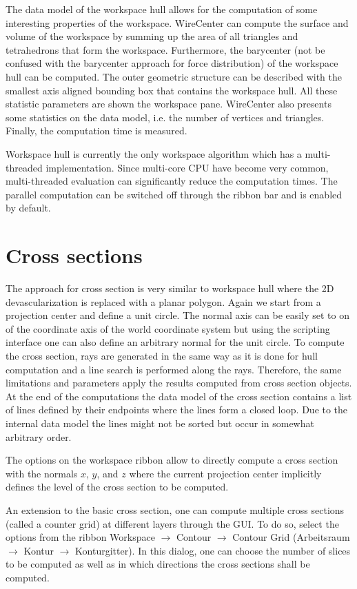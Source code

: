 \documentclass[11pt,a4paper,onepage,openany]{book}
\begin{document}
The data model of the workspace hull allows for the computation of some
interesting properties of the workspace. WireCenter can compute the surface and
volume of the workspace by summing up the area of all triangles and
tetrahedrons that form the workspace. Furthermore, the barycenter (not be
confused with the barycenter approach for force distribution) of the workspace
hull can be computed. The outer geometric structure can be described with the
smallest axis aligned bounding box that contains the workspace hull. All these
statistic parameters are shown the workspace pane. WireCenter also presents
some statistics on the data model, i.e. the number of vertices and triangles.
Finally, the computation time is measured.

Workspace hull is currently the only workspace algorithm which has a
multi-threaded implementation. Since multi-core CPU have become very common,
multi-threaded evaluation can significantly reduce the computation times. The
parallel computation can be switched off through the ribbon bar and is enabled
by default.

\section{Cross sections}
The approach for cross section is very similar to workspace hull where the 2D
devascularization is replaced with a planar polygon. Again we start from a
projection center and define a unit circle. The normal axis can be easily set
to on of the coordinate axis of the world coordinate system but using the
scripting interface one can also define an arbitrary normal for the unit
circle. To compute the cross section, rays are generated in the same way as it
is done for hull computation and a line search is performed along the rays.
Therefore, the same limitations and parameters apply the results computed from
cross section objects. At the end of the computations the data model of the
cross section contains a list of lines defined by their endpoints where the
lines form a closed loop. Due to the internal data model the lines might not be
sorted but occur in somewhat arbitrary order.

The options on the workspace ribbon allow to directly compute a cross section
with the normals $x$, $y$, and $z$ where the current projection center
implicitly defines the level of the cross section to be computed.

An extension to the basic cross section, one can compute multiple cross
sections (called a counter grid) at different layers through the GUI. To do so,
select the options from the ribbon Workspace $\rightarrow$ Contour
$\rightarrow$ Contour Grid (Arbeitsraum $\rightarrow$ Kontur $\rightarrow$
Konturgitter). In this dialog, one can choose the number of slices to be
computed as well as in which directions the cross sections shall be computed.
\end{document}
